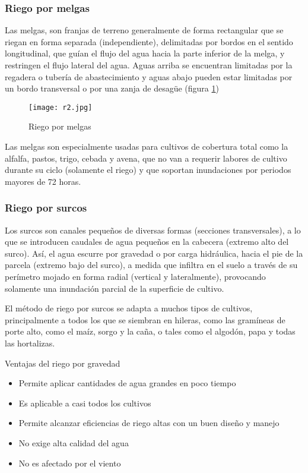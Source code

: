 \subsubsection{Riego por melgas}
Las melgas, son franjas de terreno generalmente de forma rectangular que se riegan en forma separada (independiente), delimitadas por bordos en el sentido longitudinal, que guían el flujo del agua hacia la parte inferior de la melga, y restringen el flujo lateral del agua. Aguas arriba se encuentran limitadas por la regadera o tubería de abastecimiento y aguas abajo pueden estar limitadas por un bordo transversal o por una zanja de desagüe (figura \ref{r2})
\begin{figure}[h!]
\centering
  \texttt{[image: r2.jpg]}
  \caption{Riego por melgas}
  \label{r2}
\end{figure}
Las melgas son especialmente usadas para cultivos de cobertura total como la alfalfa, pastos, trigo, cebada y avena, que no van a requerir labores de cultivo durante su ciclo (solamente el riego) y que soportan inundaciones por periodos mayores de 72 horas.

\subsubsection{Riego por surcos}
Los surcos son canales pequeños de diversas formas (secciones transversales), a lo que se introducen caudales de agua pequeños en la cabecera (extremo alto del surco). Así, el agua escurre por gravedad o por carga hidráulica, hacia el pie de la parcela (extremo bajo del surco), a medida que infiltra en el suelo a través de su perímetro mojado en forma radial (vertical y lateralmente), provocando solamente una inundación parcial de la superficie de cultivo.

El método de riego por surcos se adapta a muchos tipos de cultivos, principalmente a todos los que se siembran en hileras, como las gramíneas de porte alto, como el maíz, sorgo y la caña, o tales como el algodón, papa y todas las hortalizas.

Ventajas del riego por gravedad
\begin{itemize}
    \item Permite aplicar cantidades de agua grandes en poco tiempo
    \item Es aplicable a casi todos los cultivos
    \item Permite alcanzar eficiencias de riego altas con un buen diseño y manejo
    \item No exige alta calidad del agua
    \item No es afectado por el viento
\end{itemize}
